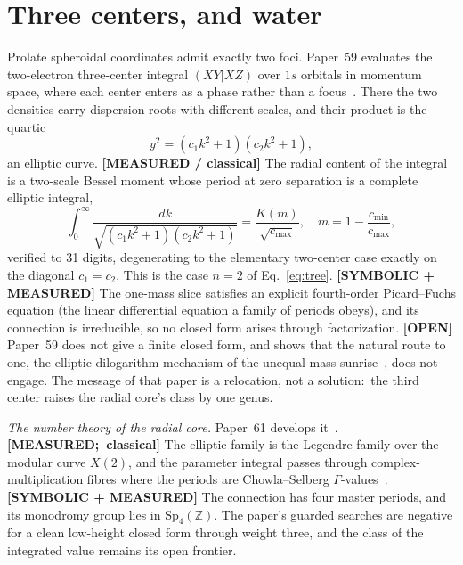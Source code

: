 \documentclass[aps,pra,twocolumn,superscriptaddress,longbibliography]{revtex4-2}
\begin{document}
\section{Three centers, and water}
\label{sec:three}

Prolate spheroidal coordinates admit exactly two foci.  Paper~59
evaluates the two-electron three-center integral $(XY|XZ)$ over $1s$
orbitals in momentum space, where each center enters as a phase rather
than a focus~\cite{loutey_paper59}.  There the two densities carry
dispersion roots with different scales, and their product is the quartic
\begin{equation}
  y^{2}=(c_{1}k^{2}+1)(c_{2}k^{2}+1),
  \label{eq:curve}
\end{equation}
an elliptic curve.  \textbf{[MEASURED / classical]} The radial content
of the integral is a two-scale Bessel moment whose period at zero
separation is a complete elliptic integral,
\begin{equation}
  \int_{0}^{\infty}\!\frac{dk}{\sqrt{(c_{1}k^{2}+1)(c_{2}k^{2}+1)}}
  =\frac{K(m)}{\sqrt{c_{\max}}},\quad m=1-\frac{c_{\min}}{c_{\max}},
  \label{eq:period}
\end{equation}
verified to 31 digits, degenerating to the elementary two-center case
exactly on the diagonal $c_1=c_2$.  This is the case $n=2$ of
Eq.~\eqref{eq:tree}.  \textbf{[SYMBOLIC + MEASURED]} The one-mass slice
satisfies an explicit fourth-order Picard--Fuchs equation (the linear
differential equation a family of periods obeys), and its
connection is irreducible, so no closed form arises through
factorization.  \textbf{[OPEN]} Paper~59 does not give a finite closed
form, and shows that the natural route to one, the elliptic-dilogarithm
mechanism of the unequal-mass sunrise~\cite{blochvanhove2015}, does not
engage.  The message of that paper is a relocation, not a solution:\ the
third center raises the radial core's class by one genus.

\emph{The number theory of the radial core.}  Paper~61 develops
it~\cite{loutey_paper61}.  \textbf{[MEASURED;\ classical]} The elliptic
family is the Legendre family over the modular curve $X(2)$, and the
parameter integral passes through complex-multiplication fibres where
the periods are Chowla--Selberg
$\Gamma$-values~\cite{chowla_selberg1967}.  \textbf{[SYMBOLIC +
MEASURED]} The connection has four master periods, and its monodromy
group lies in $\mathrm{Sp}_4(\mathbb{Z})$.  The paper's guarded searches
are negative for a clean low-height closed form through weight three,
and the class of the integrated value remains its open frontier.
\end{document}
